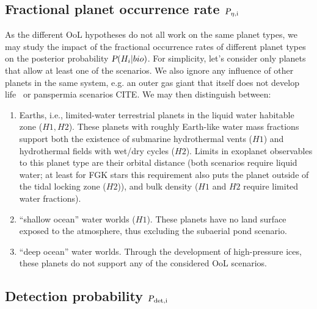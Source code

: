 \documentclass[twocolumn]{aastex631}
\begin{document}

\subsection{Fractional planet occurrence rate $\textsl{P}_\mathrm{\eta, i}$}
As the different OoL hypotheses do not all work on the same planet types, we may study the impact of the fractional occurrence rates of different planet types on the posterior probability $\textsl{P}(H_i|bio)$.
For simplicity, let's consider only planets that allow at least one of the scenarios.
We also ignore any influence of other planets in the same system, e.g. an outer gas giant that itself does not develop life~\citep{Schlecker2021a} or panspermia scenarios CITE.
We may then distinguish between:
\begin{enumerate}
    \item Earths, i.e., limited-water terrestrial planets in the liquid water habitable zone ($H1, H2$). These planets with roughly Earth-like water mass fractions support both the existence of submarine hydrothermal vents ($H1$) and hydrothermal fields with wet/dry cycles ($H2$). Limits in exoplanet observables to this planet type are their orbital distance (both scenarios require liquid water; at least for FGK stars this requirement also puts the planet outside of the tidal locking zone ($H2$)), and bulk density ($H1$ and $H2$ require limited water fractions).
    \item ``shallow ocean'' water worlds ($H1$). These planets have no land surface exposed to the atmosphere, thus excluding the subaerial pond scenario.
    \item ``deep ocean'' water worlds. Through the development of high-pressure ices, these planets do not support any of the considered OoL scenarios.
\end{enumerate}





\subsection{Detection probability $\textsl{P}_\mathrm{det, i}$}
\end{document}
